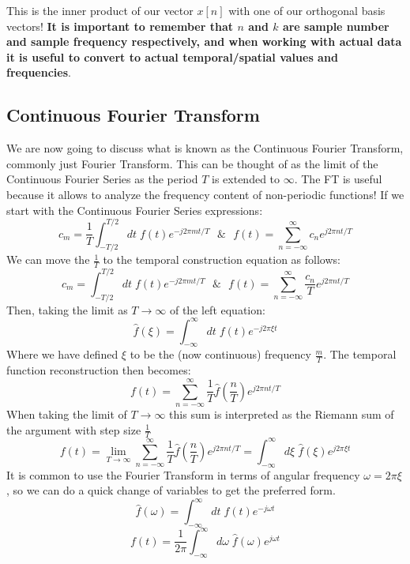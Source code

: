 \documentclass[a4paper]{article}
\numberwithin{equation}{section}
\begin{document}
This is the inner product of our vector $x[n]$ with one of our orthogonal basis vectors! \textbf{It is important to remember that $n$ and $k$ are sample number and sample frequency respectively, and when working with actual data it is useful to convert to actual temporal/spatial values and frequencies}.

\subsection{Continuous Fourier Transform}
We are now going to discuss what is known as the Continuous Fourier Transform, commonly just Fourier Transform. This can be thought of as the limit of the Continuous Fourier Series as the period $T$ is extended to $\infty$. The FT is useful because it allows to analyze the frequency content of non-periodic functions! If we start with the Continuous Fourier Series expressions:
\begin{equation}
c_m=\frac{1}{T}\int_{-T/2}^{T/2}dt\; f(t)e^{-j2\pi mt/T}\: \: \: \& \:  \: \: f(t)=\sum_{n=-\infty}^{\infty}c_n e^{j2\pi nt/T}
\end{equation}
We can move the $\frac{1}{T}$ to the temporal construction equation as follows:
\begin{equation}
c_m=\int_{-T/2}^{T/2}dt\; f(t)e^{-j2\pi mt/T}\:  \: \: \& \: \: \: f(t)=\sum_{n=-\infty}^{\infty}\frac{c_n}{T} e^{j2\pi nt/T}
\end{equation}
Then, taking the limit as $T \rightarrow \infty$ of the left equation:
\begin{equation}
\hat{f}(\xi)=\int_{-\infty}^{\infty}dt\; f(t)e^{-j2\pi \xi t}
\end{equation}
Where we have defined $\xi$ to be the (now continuous) frequency $\frac{m}{T}$. The temporal function reconstruction then becomes:
\begin{equation}
f(t)=\sum_{n=-\infty}^{\infty}\frac{1}{T}\hat{f}(\frac{n}{T}) e^{j2\pi nt/T}
\end{equation}
When taking the limit of $T\rightarrow \infty$ this sum is interpreted as the Riemann sum of the argument with step size $\frac{1}{T}$
\begin{equation}
f(t)=\lim_{T\rightarrow \infty}\sum_{n=-\infty}^{\infty}\frac{1}{T}\hat{f}(\frac{n}{T}) e^{j2\pi nt/T} = \int_{-\infty}^{\infty} d\xi \; \hat{f}(\xi) e^{j2\pi \xi t}
\end{equation}
It is common to use the Fourier Transform in terms of angular frequency $\omega=2\pi \xi$, so we can do a quick change of variables to get the preferred form.
\begin{equation}\boxed{
\hat{f}(\omega)=\int_{-\infty}^{\infty}dt\; f(t)e^{-j\omega t}}
\end{equation}
\begin{equation}\boxed{
f(t)=\frac{1}{2\pi}\int_{-\infty}^{\infty} d\omega \; \hat{f}(\omega) e^{j\omega t}}
\end{equation}
\end{document}

